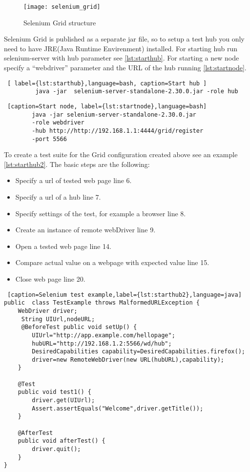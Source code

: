 		\begin{figure}
		\centering
  		\texttt{[image: selenium\_grid]}
  		\caption{Selenium Grid structure}
		\label{fig:selnium_grid}
		\end{figure}
		
		Selenium Grid is published as a separate jar file, so to setup a test hub you
		only need to have JRE(Java Runtime Envirenment) installed. For starting hub
		run selenium-server with hub parameter see \ref{lst:starthub}. For starting
		a new node specify a ``webdriver'' parameter and the URL of the hub running
		\ref{lst:startnode}.
		
		\begin{lstlisting} [ label={lst:starthub},language=bash, caption=Start hub ]
		 java -jar	selenium-server-standalone-2.30.0.jar -role hub
		\end{lstlisting}

		\begin{lstlisting} [caption=Start node, label={lst:startnode},language=bash]
		java -jar selenium-server-standalone-2.30.0.jar 
		-role webdriver
		-hub http://http://192.168.1.1:4444/grid/register
		-port 5566
		\end{lstlisting}
		

	To create a test suite for the Grid configuration created above see an
	example \ref{lst:starthub2}. The basic steps are the following:
	\begin{itemize}
	  \item Specify a url of tested web page line 6.
	  \item Specify a url of a hub line 7.
	  \item Specify settings of the test, for example a browser line 8.
	  \item Create an instance of remote webDriver line 9.
	  \item Open a tested web page line 14.
	  \item Compare actual value on a webpage with expected value line 15.
	  \item Close web page line 20.
	\end{itemize}
	
	\lstset{style=a1listing}
	\begin{lstlisting} [caption=Selenium test example,label={lst:starthub2},language=java]
public 	class TestExample throws MalformedURLException {
 	WebDriver driver;
 	 String UIUrl,nodeURL;
 	 @BeforeTest public void setUp() {
 	 	UIUrl="http://app.example.com/hellopage"; 
		hubURL="http://192.168.1.2:5566/wd/hub";
		DesiredCapabilities capability=DesiredCapabilities.firefox();
		driver=new RemoteWebDriver(new URL(hubURL),capability);
	}
		
	@Test
	public void test1() {
		driver.get(UIUrl);
		Assert.assertEquals("Welcome",driver.getTitle());
	}
	
	@AfterTest
	public void afterTest() {
		driver.quit();
	}
}
	\end{lstlisting}

